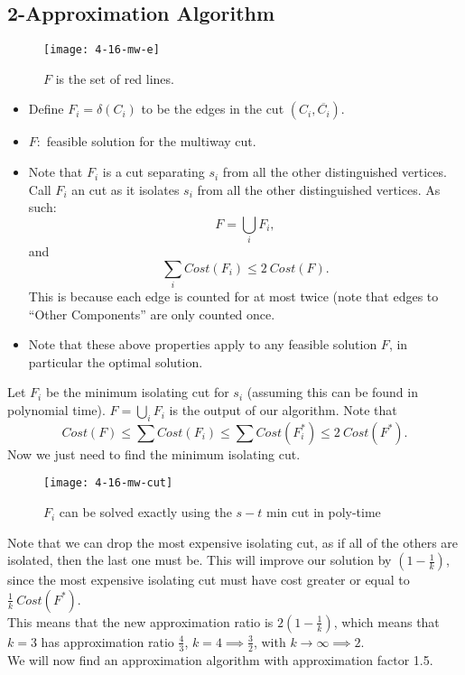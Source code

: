 \documentclass[../main/main.tex]{subfiles}
\begin{document}
\subsection{2-Approximation Algorithm}
\begin{figure}[h!]
	\centering
	\texttt{[image: 4-16-mw-e]}
	\caption{$F$ is the set of red lines.}
\end{figure}
\begin{itemize}
	\item Define $F_i=\delta(C_i)$ to be the edges in the cut $(C_i, \overline{C_i})$.
	\item $F:$ feasible solution for the multiway cut.
	\item Note that $F_i$ is a cut separating $s_i$ from all the other distinguished vertices. Call $F_i$ an  cut as it isolates $s_i$ from all the other distinguished vertices. As such: \[
	F=\bigcup\limits_{i} F_i
	,\] and \[
	\sum_{i} Cost(F_i) \le 2\ Cost(F)
.\] This is because each edge is counted for at most twice (note that edges to ``Other Components'' are only counted once.
\item Note that these above properties apply to any feasible solution $F$, in particular the optimal solution.
\end{itemize}
\begin{remark}	Let  $F_i$ be the minimum isolating cut for $s_i$ (assuming this can be found in polynomial time). $F=\bigcup\limits_{i} F_i$ is the output of our algorithm. Note that  \[
		Cost(F)\le \sum Cost(F_i) \le  \sum Cost(F^*_i)\le 2\ Cost(F^*)
	.\] Now we just need to find the minimum isolating cut.
\end{remark}
\begin{figure}[h!]
	\centering
	\texttt{[image: 4-16-mw-cut]}
	\caption{$F_i$ can be solved exactly using the $s-t$ min cut in poly-time}
	\label{fig:4-16-mw-cut}
\end{figure}
\begin{remark}
	Note that we can drop the most expensive isolating cut, as if all of the others are isolated, then the last one must be. This will improve our solution by $\left( 1-\frac{1}{k} \right) $, since the most expensive isolating cut must have cost greater or equal to $\frac{1}{k}\ Cost(F^*)$. \\
	
	This means that the new approximation ratio is $2\left( 1-\frac{1}{k} \right) $, which means that $k=3$ has approximation ratio  $\frac{4}{3}$, $k=4\implies \frac{3}{2}$, with $k\to \infty \implies 2$. \\
	
	We will now find an approximation algorithm with approximation factor 1.5.
\end{remark}
\end{document}
